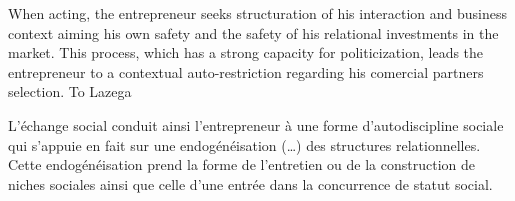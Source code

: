 \documentclass[a4paper, 12pt, openright, oneside, german, french, brazil, english]{abntex2}
\begin{document}
	
	When acting, the entrepreneur seeks structuration of his interaction and business context aiming his own safety and the safety of his relational investments in the market. This process, which has a strong capacity for politicization, leads the entrepreneur to a contextual auto-restriction regarding his comercial partners selection. To Lazega
	
	\begin{citacao}
		L'échange social conduit ainsi l'entrepreneur à une forme d'autodiscipline sociale qui s'appuie en fait sur une endogénéisation (\dots) des structures relationnelles. Cette endogénéisation prend la forme de l'entretien ou de la construction de niches sociales ainsi que celle d'une entrée dans la concurrence de statut social. \cite[p. 572]{lazega2009theorie}
	\end{citacao}
	
	
\end{document}
